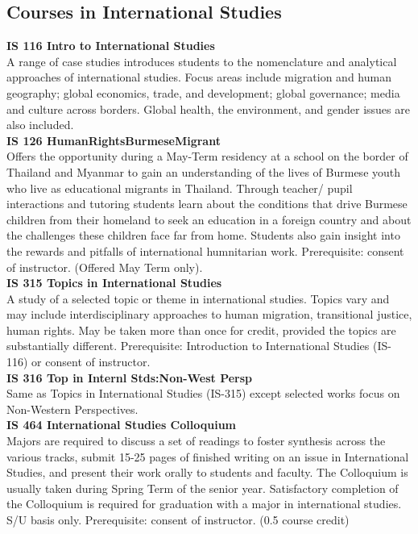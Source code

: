 \documentclass[
  letterpaper,
]{scrbook}
\begin{document}
\subsection{Courses in International Studies}\label{sec-courses-in-IS}

\textbf{IS 116 Intro to International Studies}\\
A range of case studies introduces students to the nomenclature and
analytical approaches of international studies. Focus areas include
migration and human geography; global economics, trade, and development;
global governance; media and culture across borders. Global health, the
environment, and gender issues are also included.\\
\textbf{IS 126 HumanRightsBurmeseMigrant}\\
Offers the opportunity during a May-Term residency at a school on the
border of Thailand and Myanmar to gain an understanding of the lives of
Burmese youth who live as educational migrants in Thailand. Through
teacher/ pupil interactions and tutoring students learn about the
conditions that drive Burmese children from their homeland to seek an
education in a foreign country and about the challenges these children
face far from home. Students also gain insight into the rewards and
pitfalls of international humnitarian work. Prerequisite: consent of
instructor. (Offered May Term only).\\
\textbf{IS 315 Topics in International Studies}\\
A study of a selected topic or theme in international studies. Topics
vary and may include interdisciplinary approaches to human migration,
transitional justice, human rights. May be taken more than once for
credit, provided the topics are substantially different. Prerequisite:
Introduction to International Studies (IS-116) or consent of
instructor.\\
\textbf{IS 316 Top in Internl Stds:Non-West Persp}\\
Same as Topics in International Studies (IS-315) except selected works
focus on Non-Western Perspectives.\\
\textbf{IS 464 International Studies Colloquium}\\
Majors are required to discuss a set of readings to foster synthesis
across the various tracks, submit 15-25 pages of finished writing on an
issue in International Studies, and present their work orally to
students and faculty. The Colloquium is usually taken during Spring Term
of the senior year. Satisfactory completion of the Colloquium is
required for graduation with a major in international studies. S/U basis
only. Prerequisite: consent of instructor. (0.5 course credit)
\end{document}
